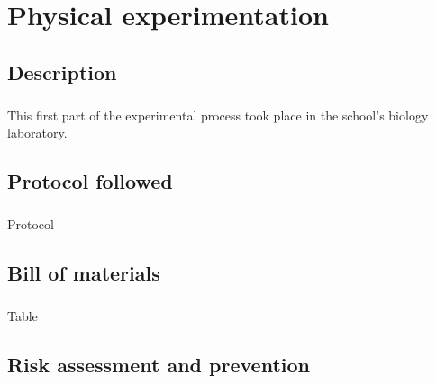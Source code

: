\chapter{Physical experimentation}
\section{Description}
\paragraph{}This first part of the experimental process took place in the school's biology laboratory. 
\section{Protocol followed}
\paragraph{}Protocol
\section{Bill of materials}
\paragraph{}Table
\section{Risk assessment and prevention}
